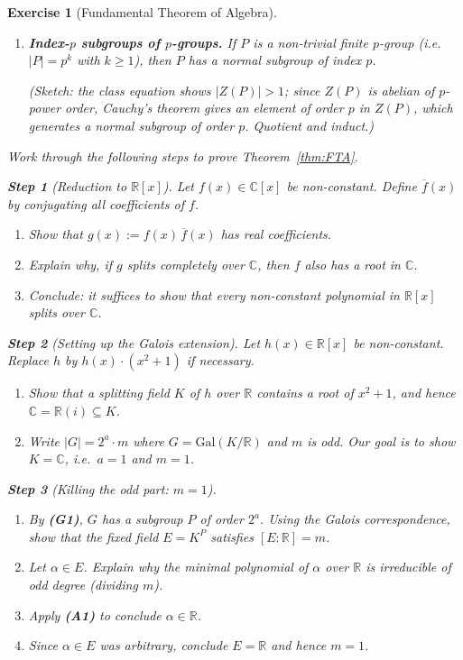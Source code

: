 \documentclass{article}
\newtheorem{exer}{Exercise}
\newcommand{\C}{\mathbb{C}}
\newcommand{\R}{\mathbb{R}}
\begin{document}
\begin{exer}[Fundamental Theorem of Algebra]
\begin{enumerate}
\item[\textbf{(G2)}] \textbf{Index-$p$ subgroups of $p$-groups.} If $P$ is a non-trivial finite $p$-group (i.e.\ $|P|=p^k$ with $k\ge 1$), then $P$ has a normal subgroup of index $p$.

(Sketch: the class equation shows $|Z(P)|>1$; since $Z(P)$ is abelian of $p$-power order, Cauchy's theorem gives an element of order $p$ in $Z(P)$, which generates a normal subgroup of order $p$. Quotient and induct.)
\end{enumerate}


Work through the following steps to prove Theorem~\ref{thm:FTA}.

\medskip
\noindent\textbf{Step 1} (Reduction to $\R[x]$).\;
Let $f(x)\in\C[x]$ be non-constant. Define $\overline{f}(x)$ by conjugating all coefficients of $f$.
\begin{enumerate}
\item[(a)] Show that $g(x):=f(x)\,\overline{f}(x)$ has real coefficients.
\item[(b)] Explain why, if $g$ splits completely over $\C$, then $f$ also has a root in $\C$.
\item[(c)] Conclude: it suffices to show that every non-constant polynomial in $\R[x]$ splits over $\C$.
\end{enumerate}

\medskip
\noindent\textbf{Step 2} (Setting up the Galois extension).\;
Let $h(x)\in\R[x]$ be non-constant. Replace $h$ by $h(x)\cdot(x^2+1)$ if necessary.
\begin{enumerate}
\item[(a)] Show that a splitting field $K$ of $h$ over $\R$ contains a root of $x^2+1$, and hence $\C=\R(i)\subseteq K$.

\item[(b)] Write $|G|=2^a\cdot m$ where $G=\mathrm{Gal}(K/\R)$ and $m$ is odd. Our goal is to show $K=\C$, i.e.\ $a=1$ and $m=1$.
\end{enumerate}

\medskip
\noindent\textbf{Step 3} (Killing the odd part: $m=1$).\;
\begin{enumerate}
\item[(a)] By \textbf{(G1)}, $G$ has a subgroup $P$ of order $2^a$. Using the Galois correspondence, show that the fixed field $E=K^P$ satisfies $[E:\R]=m$.
\item[(b)] Let $\alpha\in E$. Explain why the minimal polynomial of $\alpha$ over $\R$ is irreducible of odd degree (dividing $m$).
\item[(c)] Apply \textbf{(A1)} to conclude $\alpha\in\R$.
\item[(d)] Since $\alpha\in E$ was arbitrary, conclude $E=\R$ and hence $m=1$.
\end{enumerate}


\end{exer}
\end{document}
